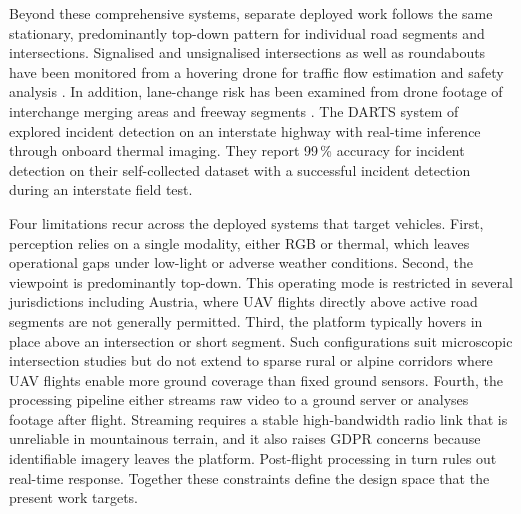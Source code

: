 \documentclass[12pt,oneside,bibtotoc,liststotoc]{scrbook}
\begin{document}
Beyond these comprehensive systems, separate deployed work
follows the same stationary, predominantly top-down pattern
for individual road segments and intersections. Signalised and unsignalised
intersections as well as roundabouts have been monitored from a hovering
drone for traffic flow estimation
\cite{khan2018UAVTrafficSignalisedIntersections, khan2018UAVtrafficUrbanRoundabouts} and
safety analysis
\cite{yang2021functionalSafetyRiskSignalisedIntersections,
    vuong2021intersectionMixedTrafficSafetyCloudModel}.
In addition, lane-change risk has been examined from drone footage of interchange
merging areas and freeway segments
\cite{gu2019UAVcrashRiskInterchangeMerging,park2018laneChangeRiskTrajectoryData}.
The DARTS system of \citet{li2025DARTSdroneTrafficIncidentDetection} explored
incident detection on an interstate highway with real-time inference through onboard
thermal imaging. They report 99\,\% accuracy for incident detection on their self-collected dataset
with a successful incident detection during an interstate field test.

Four limitations recur across the deployed systems that target vehicles.
First, perception relies on a single modality, either RGB or thermal,
which leaves operational gaps under low-light or adverse weather
conditions. Second, the viewpoint is predominantly top-down. This
operating mode is restricted in several jurisdictions including Austria,
where UAV flights directly above active road segments are not generally
permitted. Third, the platform typically hovers in place above an
intersection or short segment. Such configurations suit microscopic
intersection studies but do not extend to sparse rural or
alpine corridors where UAV flights enable more ground coverage than fixed
ground sensors. Fourth, the processing pipeline either streams raw
video to a ground server or analyses footage after flight.
Streaming requires a stable high-bandwidth radio link that is unreliable
in mountainous terrain, and it also raises GDPR concerns because
identifiable imagery leaves the platform. Post-flight processing in turn
rules out real-time response. Together these constraints define the
design space that the present work targets.
\end{document}

